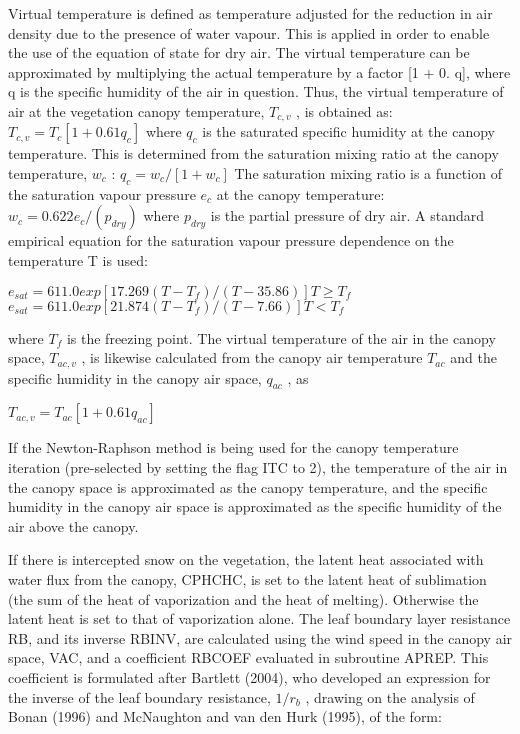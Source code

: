 Virtual temperature is defined as temperature adjusted for the reduction in air density due to the presence of water vapour. This is applied in order to enable the use of the equation of state for dry air. The virtual temperature can be approximated by multiplying the actual temperature by a factor \mbox{[}1 + 0. q\mbox{]}, where q is the specific humidity of the air in question. Thus, the virtual temperature of air at the vegetation canopy temperature, $T_{c,v}$ , is obtained as\+: $T_{c,v} = T_c [1 + 0.61 q_c ]$ where $q_c$ is the saturated specific humidity at the canopy temperature. This is determined from the saturation mixing ratio at the canopy temperature, $w_c$ \+: $q_c = w_c /[1 + w_c ]$ The saturation mixing ratio is a function of the saturation vapour pressure $e_c$ at the canopy temperature\+: $w_c = 0.622 e_c /(p_{dry} )$ where $p_{dry}$ is the partial pressure of dry air. A standard empirical equation for the saturation vapour pressure dependence on the temperature T is used\+:

$e_{sat} = 611.0 exp[17.269(T - T_f )/(T - 35.86)] T \geq T_f$ $e_{sat} = 611.0 exp[21.874(T - T_f )/(T - 7.66)] T < T_f$

where $T_f$ is the freezing point. The virtual temperature of the air in the canopy space, $T_{ac,v}$ , is likewise calculated from the canopy air temperature $T_{ac}$ and the specific humidity in the canopy air space, $q_{ac}$ , as

$T_{ac,v} = T_{ac} [1 + 0.61 q_{ac} ]$

If the Newton-\/\+Raphson method is being used for the canopy temperature iteration (pre-\/selected by setting the flag I\+T\+C to 2), the temperature of the air in the canopy space is approximated as the canopy temperature, and the specific humidity in the canopy air space is approximated as the specific humidity of the air above the canopy.

If there is intercepted snow on the vegetation, the latent heat associated with water flux from the canopy, C\+P\+H\+C\+H\+C, is set to the latent heat of sublimation (the sum of the heat of vaporization and the heat of melting). Otherwise the latent heat is set to that of vaporization alone. The leaf boundary layer resistance R\+B, and its inverse R\+B\+I\+N\+V, are calculated using the wind speed in the canopy air space, V\+A\+C, and a coefficient R\+B\+C\+O\+E\+F evaluated in subroutine A\+P\+R\+E\+P. This coefficient is formulated after Bartlett (2004), who developed an expression for the inverse of the leaf boundary resistance, $1/r_b$ , drawing on the analysis of Bonan (1996) and Mc\+Naughton and van den Hurk (1995), of the form\+:

